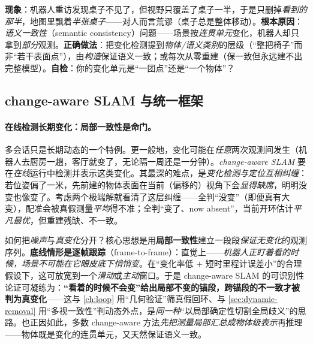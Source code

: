 \begin{pitfall}
\textbf{现象}：机器人重访发现桌子不见了，但视野只覆盖了桌子一半，于是只删掉\emph{看到的那半}，地图里飘着\emph{半张桌子}——对人而言荒谬（桌子总是整体移动）。\textbf{根本原因}：\emph{语义一致性}（semantic consistency）问题——场景按\emph{连贯单元}变化，机器人却只拿到\emph{部分}观测。\textbf{正确做法}：把变化检测提到\emph{物体/语义类别}的层级（“整把椅子”而非“若干表面点”），由\emph{构造}保证语义一致；或每次从零重建（保一致但永远建不出完整模型）。\textbf{自检}：你的变化单元是“一团点”还是“一个物体”？
\end{pitfall}

\subsection{change-aware SLAM 与统一框架}
\label{sec:dynamic-change-aware}

\paragraph{在线检测长期变化：局部一致性是命门。}
多会话只是长期动态的一个特例。更一般地，变化可能在\emph{任意}两次观测间发生（机器人去厨房一趟，客厅就变了，无论隔一周还是一分钟）。\emph{change-aware SLAM} 要在\emph{在线}运行中检测并表示这类变化。其最深的难点，是\emph{变化检测与定位互相纠缠}\cite{schmid2026dynamic}：若位姿偏了一米，先前建的物体表面在当前（偏移的）视角下会\emph{显得缺席}，明明没变也像变了。考虑两个极端解就看清了这层纠缠——全判“没变”（即便真有大变），配准会被真假测量\emph{平均}得不准；全判“变了、now absent”，当前开环估计\emph{平凡最优}，但重建残缺、不一致。

\begin{insight}
如何把\emph{噪声}与\emph{真变化}分开？核心思想是用\textbf{局部一致性}建立一段段\emph{保证无变化}的观测序列\cite{schmid2026dynamic}。\textbf{底线情形是逐帧跟踪}（frame-to-frame）：直觉上——\emph{机器人正盯着看的时候，场景不可能在它眼皮底下悄悄变}。在“变化率低 $+$ 短时里程计误差小”的合理假设下，这可放宽到一个\emph{滑动}或\emph{主动}窗口。于是 change-aware SLAM 的可识别性论证可凝练为：\textbf{“看着的时候不会变”给出局部不变的锚段，跨锚段的不一致才被判为真变化}——这与 \cref{ch:loop} 用“几何验证”筛真假回环、与 \cref{sec:dynamic-removal} 用“多视一致性”判动态外点，是\emph{同一种}“以局部确定性切割全局歧义”的思路。也正因如此，多数 change-aware 方法\emph{先把测量局部汇总成物体级表示}再推理——物体既是变化的连贯单元，又天然保证语义一致。
\end{insight}

